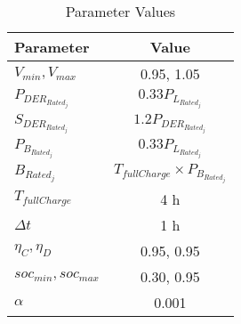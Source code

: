 \documentclass[../../outputs/main.tex]{subfiles}
\begin{document}
\begin{table}[h!]
    \centering
    \caption{Parameter Values}
    \begin{tabular}{|l|c|}
    \hline
    \textbf{Parameter} & \textbf{Value} \\ \hline
    $V_{min}, V_{max}$ & 0.95, 1.05 \\ \hline
    $P_{DER_{Rated_j}}$ & $0.33 P_{L_{Rated_j}}$ \\ \hline
    $S_{DER_{Rated_j}}$ & $1.2 P_{DER_{Rated_j}}$ \\ \hline
    $P_{B_{Rated_j}}$ & $0.33 P_{L_{Rated_j}}$ \\ \hline
    $B_{Rated_j}$ & $T_{fullCharge} \times P_{B_{Rated_j}}$ \\ \hline
    $T_{fullCharge}$ & 4 h \\ \hline
    $\Delta t$ & 1 h \\ \hline
    $\eta_C, \eta_D$ & 0.95, 0.95 \\ \hline
    $soc_{min}, soc_{max}$ & 0.30, 0.95 \\ \hline
    $\alpha$ & 0.001 \\ \hline
    \end{tabular}
    \label{table:parameter-values}
\end{table}
\end{document}
